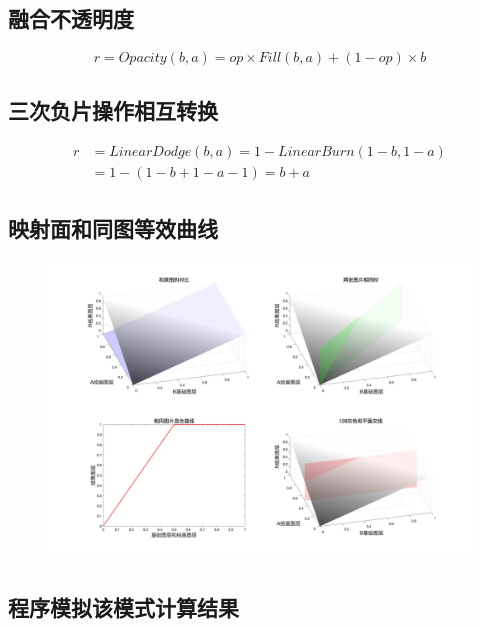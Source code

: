 \subsection{ 融合不透明度}


\begin{equation}r=Opacity(b,a)=op\times Fill(b,a)+(1-op)\times b\end{equation}

\subsection{ 三次负片操作相互转换}

\begin{equation}
\begin{aligned}
	r&=LinearDodge(b,a)= 1-LinearBurn(1-b,1-a)\\& = 1-(1-b+1-a-1)=b+a
\end{aligned}
\end{equation}

\subsection{ 映射面和同图等效曲线}
\begin{figure}[h!]
	\centering
	\includegraphics[width=\linewidth]{figure/线性减淡.jpg}
	\caption{}
	\label{fig:}
\end{figure}


\subsection{ 程序模拟该模式计算结果}

